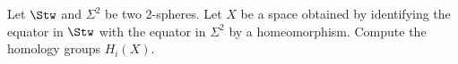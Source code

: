 Let $\Stw$ and $\Sigma^2$ be two $2$-spheres. Let $X$ be a space
obtained by identifying the equator in $\Stw$ with the equator in
$\Sigma^2$ by a homeomorphism. Compute the homology groups $H_i(X)$. 
